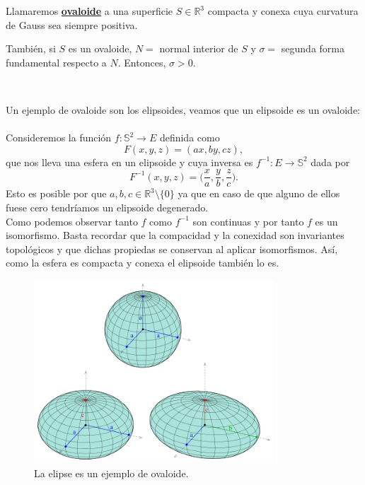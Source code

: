 \begin{definicion}
\begin{definicion}
	Llamaremos \underline{\textbf{ovaloide}} a una superficie $S \in \mathbb{R}^3$ compacta y conexa cuya curvatura de Gauss sea siempre positiva.
	
	También, si $S$ es un ovaloide, $N =$ normal interior de $S$ y $\sigma =$ segunda forma fundamental respecto a $N$. Entonces, $\sigma > 0$.
\end{definicion}
${ }$\\

\begin{ejemplo} 
	
	Un ejemplo de ovaloide son los elipsoides, veamos que un elipsoide es un ovaloide:
${ }$\\

	Consideremos la función $f : \mathbb{S}^2 \to E$ definida como
	\[
		F(x,y,z) = (ax,by,cz),
	\]
	que nos lleva una esfera en un elipsoide y cuya inversa es $f^{-1} : E \to \mathbb{S}^2$ dada por
	\[
		F^{-1} (x,y,z) = \Big(\frac x a, \frac y b, \frac z c \Big).
	\]
	Esto es posible por que $a,b,c \in \mathbb{R}^3 \setminus \{0\}$ ya que en caso de que alguno de ellos fuese cero tendríamos un elipsoide degenerado.
	${ }$\\
	
	Como podemos observar tanto $f$ como $f^{-1}$ son continuas y por tanto $f$ es un isomorfismo. Basta recordar que la compacidad y la conexidad son invariantes topológicos y que dichas propiedas se conservan al aplicar isomorfismos. Así, como la esfera es compacta y conexa el elipsoide también lo es.
	
	
	
		\begin{figure}[h]
			\begin{center}
				\includegraphics[width=0.8\textwidth]{imagenes/ellipsoid.png}
			\end{center}
			\caption{La elipse es un ejemplo de ovaloide.}
			\label{fig:etiq_3}
		\end{figure}
		

\end{ejemplo}
\end{definicion}
